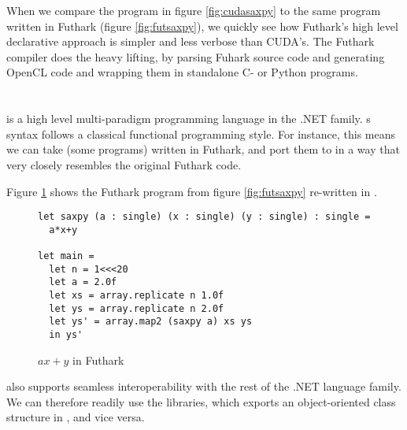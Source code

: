 When we compare the program in figure \ref{fig:cudasaxpy} to the same program
written in Futhark (figure \ref{fig:futsaxpy}), we quickly see how Futhark's
high level declarative approach is simpler and less verbose than CUDA's.
The Futhark compiler does the heavy lifting, by parsing Fuhark source code and
generating OpenCL code and wrapping them in standalone C- or Python programs.

\section{\fsharp{}}
\fsharp{} is a high level multi-paradigm programming language in the .NET family.
\fsharp{}s syntax follows a classical functional programming style. For
instance, this means we can take (some programs) written in Futhark, and port
them to \fsharp{} in a way that very closely resembles the original Futhark
code.

Figure \ref{fig:fsharpsaxpy} shows the Futhark program from
figure \ref{fig:futsaxpy} re-written in \fsharp{}.

\begin{figure}[H]
  \centering
\begin{verbatim}
let saxpy (a : single) (x : single) (y : single) : single =
  a*x+y
  
let main =
  let n = 1<<<20
  let a = 2.0f
  let xs = array.replicate n 1.0f
  let ys = array.replicate n 2.0f
  let ys' = array.map2 (saxpy a) xs ys
  in ys'
  \end{verbatim}
  \caption{$ax+y$ in Futhark}
  \label{fig:fsharpsaxpy}
\end{figure}

\fsharp{} also supports seamless interoperability with the rest of the .NET 
language family. We can therefore readily use the \csharp{} libraries, which
exports an object-oriented class structure in \fsharp{}, and vice versa.

\section*{\csharp{}}
\csharp{} 
\csharp{} 
\csharp{} 
\csharp{} 


